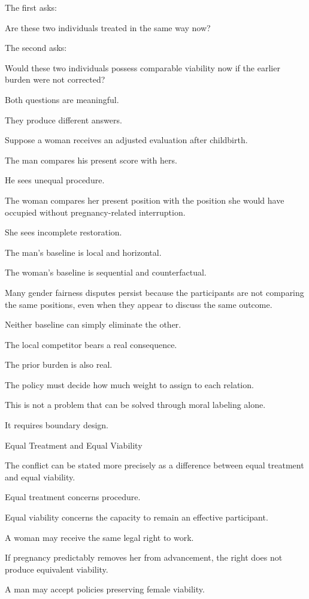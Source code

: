 The first asks:

Are these two individuals treated in the same way now?

The second asks:

Would these two individuals possess comparable viability now if the earlier burden were not corrected?

Both questions are meaningful.

They produce different answers.

Suppose a woman receives an adjusted evaluation after childbirth.

The man compares his present score with hers.

He sees unequal procedure.

The woman compares her present position with the position she would have occupied without pregnancy-related interruption.

She sees incomplete restoration.

The man’s baseline is local and horizontal.

The woman’s baseline is sequential and counterfactual.

Many gender fairness disputes persist because the participants are not comparing the same positions, even when they appear to discuss the same outcome.

Neither baseline can simply eliminate the other.

The local competitor bears a real consequence.

The prior burden is also real.

The policy must decide how much weight to assign to each relation.

This is not a problem that can be solved through moral labeling alone.

It requires boundary design.

Equal Treatment and Equal Viability

The conflict can be stated more precisely as a difference between equal treatment and equal viability.

Equal treatment concerns procedure.

Equal viability concerns the capacity to remain an effective participant.

A woman may receive the same legal right to work.

If pregnancy predictably removes her from advancement, the right does not produce equivalent viability.

A man may accept policies preserving female viability.

